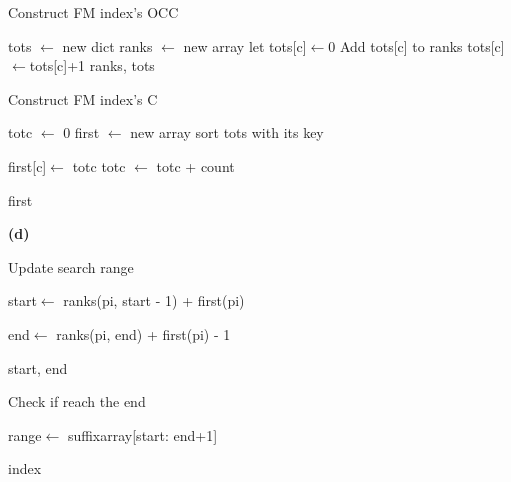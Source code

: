\documentclass[11pt]{article}
\renewcommand\part[1]{\vspace{.10in}\textbf{(#1)}}
\begin{document}
\begin{algorithm}[H]
	\caption{Construct FM index's OCC}\label{fmocc}
	\begin{algorithmic}[1]
		\State tots $ \gets $ new dict
		\State ranks $ \gets $ new array
		\State let tots[c]$ \gets $0
		\EndIf
		\State Add tots[c] to ranks
		\State tots[c] $ \gets $tots[c]+1
		\EndFor
		\State\Return ranks, tots
		\EndFunction
		
	\end{algorithmic}
\end{algorithm}

\begin{algorithm}[H]
	\caption{Construct FM index's C}\label{fmc}
	\begin{algorithmic}[1]
		\State totc $ \gets $ 0
		\State first $ \gets $ new array
		\State sort tots with its key

		\State first[c]$ \gets $ totc
		\State totc $ \gets $ totc + count


		\EndFor
		\State\Return first
		\EndFunction
		
	\end{algorithmic}
\end{algorithm}
	
\part{d}

\begin{algorithm}[H]
	\caption{Update search range}\label{update}
	\begin{algorithmic}[1]
		\State start$ \gets $ ranks(pi, start - 1) + first(pi)

		\State end$ \gets $ ranks(pi, end) + first(pi) - 1

		\State\Return start, end
		\EndFunction
		
	\end{algorithmic}
\end{algorithm}

\begin{algorithm}[H]
	\caption{Check if reach the end}\label{check}
	\begin{algorithmic}[1]
		\State range$ \gets $ suffixarray[start: end+1]
		
		\State \Return index
		\EndIf
		\EndFor
		\EndFunction
		
	\end{algorithmic}
\end{algorithm}
\end{document}
